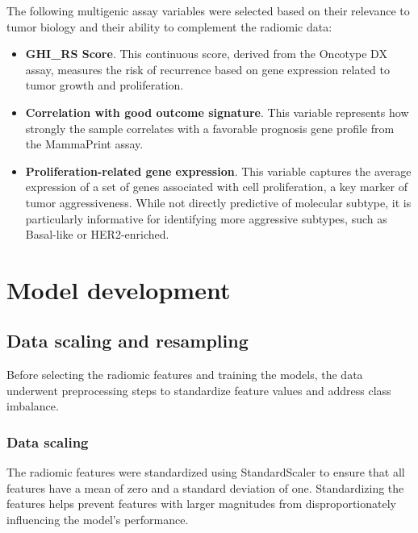 \documentclass[conference]{IEEEtran}
\begin{document}
The following multigenic assay variables were selected based on their relevance to tumor biology and their ability to complement the radiomic data:

\begin{itemize}
    \item \textbf{GHI\_RS Score}. This continuous score, derived from the Oncotype DX assay, measures the risk of recurrence based on gene expression related to tumor growth and proliferation. \cite{b7}
    \item \textbf{Correlation with good outcome signature}. This variable represents how strongly the sample correlates with a favorable prognosis gene profile from the MammaPrint assay. \cite{b8}
    \item \textbf{Proliferation-related gene expression}. This variable captures the average expression of a set of genes associated with cell proliferation, a key marker of tumor aggressiveness. While not directly predictive of molecular subtype, it is particularly informative for identifying more aggressive subtypes, such as Basal-like or HER2-enriched.
\end{itemize}


\section{Model development}

\subsection{Data scaling and resampling}

Before selecting the radiomic features and training the models, the data underwent preprocessing steps to standardize feature values and address class imbalance.

\subsubsection{Data scaling}

The radiomic features were standardized using StandardScaler to ensure that all features have a mean of zero and a standard deviation of one. Standardizing the features helps prevent features with larger magnitudes from disproportionately influencing the model's performance.
\end{document}
